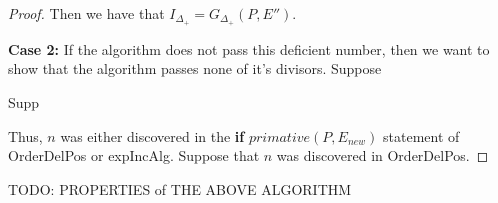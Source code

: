 \documentclass[../paper.tex]{subfiles}
\begin{document}
\begin{proof}



Then we have that $I_{\Delta_+} = G_{\Delta_+}(P, E'')$. 


\textbf{Case 2:}
  If the algorithm does not pass this deficient number, then we want
to show that the algorithm passes none of it's divisors. Suppose

Supp 


Thus, $n$ was either discovered in the 
\textbf{if} $primative(P,E_{new})$ statement of OrderDelPos or
expIncAlg. Suppose that $n$ was discovered in OrderDelPos.


\end{proof}

TODO: PROPERTIES of THE ABOVE ALGORITHM~
\end{document}
